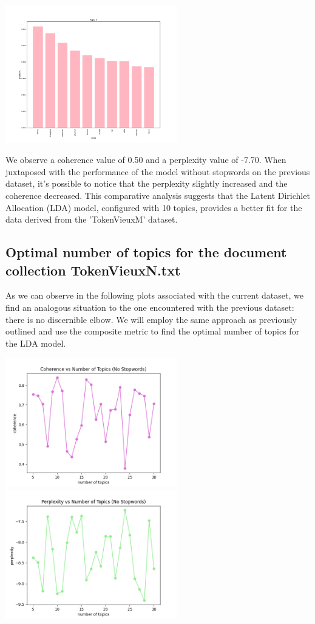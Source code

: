 \documentclass[10pt]{article} %
\begin{document}
\begin{center}
		\includegraphics[width=7.5cm]{images/plots/test_5_no_stopwords_dataset_2/topic_7.png}	
	\end{center}
	
	We observe a coherence value of 0.50 and a perplexity value of -7.70. When juxtaposed with the performance of the model without stopwords on the previous dataset, it's possible to notice that the perplexity slightly increased and the coherence decreased. This comparative analysis suggests that the Latent Dirichlet Allocation (LDA) model, configured with 10 topics, provides a better fit for the data derived from the 'TokenVieuxM' dataset.
	
	\subsection{Optimal number of topics for the document collection TokenVieuxN.txt}
	
	As we can observe in the following plots associated with the current dataset, we find an analogous situation to the one encountered with the previous dataset: there is no discernible elbow. We will employ the same approach as previously outlined and use the composite metric to find the optimal number of topics for the LDA model.
	
	\begin{center}
		\includegraphics[width=7.5cm]{images/coherence_no_stopwords_diff_n_topics_2}
		\includegraphics[width=7.5cm]{images/perplexity_no_stopwords_diff_n_topics_2}
	\end{center}
	
\end{document}
